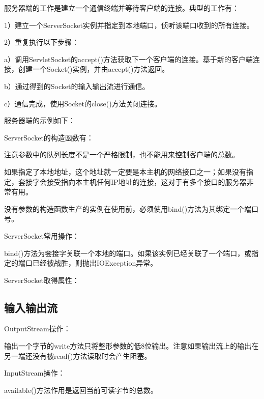 		服务器端的工作是建立一个通信终端并等待客户端的连接。典型的工作有：

		1）建立一个ServerSocket实例并指定到本地端口，侦听该端口收到的所有连接。

		2）重复执行以下步骤：

		a）调用ServletSocket的accept()方法获取下一个客户端的连接。基于新的客户端连接，创建一个Socket()实例，并由accept()方法返回。

		b）通过得到的Socket的输入输出流进行通信。

		c）通信完成，使用Socket的close()方法关闭连接。

		服务器端的示例如下：

		

		ServerSocket的构造函数有：

		

		注意参数中的队列长度不是一个严格限制，也不能用来控制客户端的总数。

		如果指定了本地地址，这个地址就一定要是本主机的网络接口之一；如果没有指定，套接字会接受指向本主机任何IP地址的连接，这对于有多个接口的服务器非常有用。

		没有参数的构造函数生产的实例在使用前，必须使用bind()方法为其绑定一个端口号。

		ServerSocket常用操作：

		

		bind()方法为套接字关联一个本地的端口。如果该实例已经关联了一个端口，或指定的端口已经被战胜，则抛出IOException异常。

		ServerSocket取得属性：

		
		
	\subsection{输入输出流}

		OutputStream操作：

		
		
		输出一个字节的write方法只将整形参数的低8位输出。注意如果输出流上的输出在另一端还没有被read()方法读取时会产生阻塞。

		InputStream操作：

		

		available()方法作用是返回当前可读字节的总数。
		

